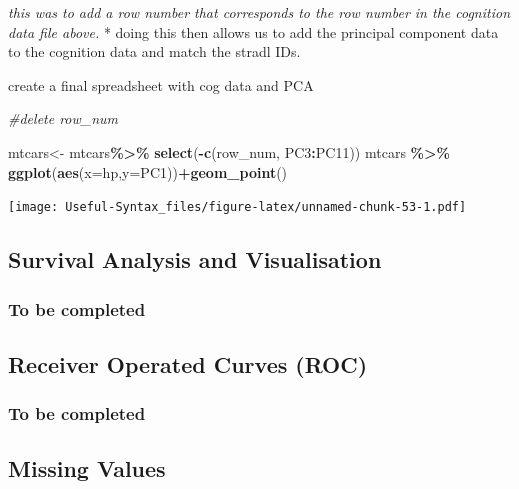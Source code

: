 \documentclass[
]{article}
\newenvironment{Shaded}{\begin{snugshade}}{\end{snugshade}}
\newcommand{\AttributeTok}[1]{\textcolor[rgb]{0.13,0.29,0.53}{#1}}
\newcommand{\CommentTok}[1]{\textcolor[rgb]{0.56,0.35,0.01}{\textit{#1}}}
\newcommand{\FunctionTok}[1]{\textcolor[rgb]{0.13,0.29,0.53}{\textbf{#1}}}
\newcommand{\NormalTok}[1]{#1}
\newcommand{\OtherTok}[1]{\textcolor[rgb]{0.56,0.35,0.01}{#1}}
\newcommand{\SpecialCharTok}[1]{\textcolor[rgb]{0.81,0.36,0.00}{\textbf{#1}}}
\begin{document}
\emph{this was to add a row number that corresponds to the row number in the cognition data file above.}
* doing this then allows us to add the principal component data to the cognition data and match the stradl IDs.

create a final spreadsheet with cog data and PCA

\begin{Shaded}
\begin{Highlighting}[]
\CommentTok{\#delete row\_num}

\NormalTok{mtcars}\OtherTok{\textless{}{-}}\NormalTok{ mtcars}\SpecialCharTok{\%\textgreater{}\%} \FunctionTok{select}\NormalTok{(}\SpecialCharTok{{-}}\FunctionTok{c}\NormalTok{(row\_num, PC3}\SpecialCharTok{:}\NormalTok{PC11))}
\NormalTok{mtcars }\SpecialCharTok{\%\textgreater{}\%} \FunctionTok{ggplot}\NormalTok{(}\FunctionTok{aes}\NormalTok{(}\AttributeTok{x=}\NormalTok{hp,}\AttributeTok{y=}\NormalTok{PC1))}\SpecialCharTok{+}\FunctionTok{geom\_point}\NormalTok{()}
\end{Highlighting}
\end{Shaded}

\texttt{[image: Useful-Syntax\_files/figure-latex/unnamed-chunk-53-1.pdf]}

\hypertarget{survival-analysis-and-visualisation}{%
\subsection{Survival Analysis and Visualisation}\label{survival-analysis-and-visualisation}}

\hypertarget{to-be-completed}{%
\subsubsection{To be completed}\label{to-be-completed}}

\hypertarget{receiver-operated-curves-roc}{%
\subsection{Receiver Operated Curves (ROC)}\label{receiver-operated-curves-roc}}

\hypertarget{to-be-completed-1}{%
\subsubsection{To be completed}\label{to-be-completed-1}}

\hypertarget{missing-values}{%
\subsection{Missing Values}\label{missing-values}}
\end{document}
